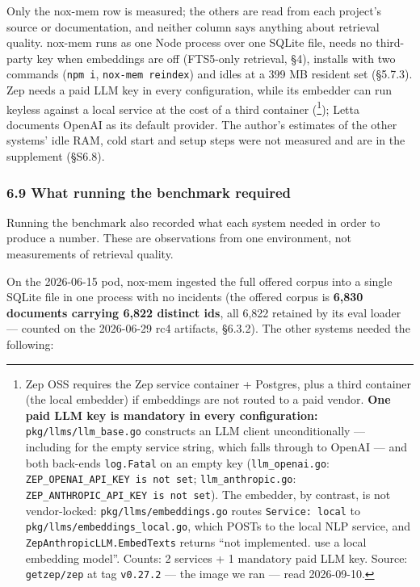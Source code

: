 \documentclass[
]{article}
\begin{document}
Only the nox-mem row is measured; the others are read from each
project's source or documentation, and neither column says anything
about retrieval quality. nox-mem runs as one Node process over one
SQLite file, needs no third-party key when embeddings are off (FTS5-only
retrieval, §4), installs with two commands (\texttt{npm\ i},
\texttt{nox-mem\ reindex}) and idles at a 399 MB resident set (§5.7.3).
Zep needs a paid LLM key in every configuration, while its embedder can
run keyless against a local service at the cost of a third container
(\footnote{Zep OSS requires the Zep service container + Postgres, plus a
  third container (the local embedder) if embeddings are not routed to a
  paid vendor. \textbf{One paid LLM key is mandatory in every
  configuration:} \texttt{pkg/llms/llm\_base.go} constructs an LLM
  client unconditionally --- including for the empty service string,
  which falls through to OpenAI --- and both back-ends
  \texttt{log.Fatal} on an empty key (\texttt{llm\_openai.go}:
  \texttt{ZEP\_OPENAI\_API\_KEY\ is\ not\ set};
  \texttt{llm\_anthropic.go}:
  \texttt{ZEP\_ANTHROPIC\_API\_KEY\ is\ not\ set}). The embedder, by
  contrast, is not vendor-locked: \texttt{pkg/llms/embeddings.go} routes
  \texttt{Service:\ local} to \texttt{pkg/llms/embeddings\_local.go},
  which POSTs to the local NLP service, and
  \texttt{ZepAnthropicLLM.EmbedTexts} returns ``not implemented. use a
  local embedding model''. Counts: 2 services + 1 mandatory paid LLM
  key. Source: \texttt{getzep/zep} at tag \texttt{v0.27.2} --- the image
  we ran --- read 2026-09-10.}); Letta documents OpenAI as its default
provider. The author's estimates of the other systems' idle RAM, cold
start and setup steps were not measured and are in the supplement
(§S6.8).

\subsubsection{6.9 What running the benchmark
required}\label{what-running-the-benchmark-required}

Running the benchmark also recorded what each system needed in order to
produce a number. These are observations from one environment, not
measurements of retrieval quality.

On the 2026-06-15 pod, nox-mem ingested the full offered corpus into a
single SQLite file in one process with no incidents (the offered corpus
is \textbf{6,830 documents carrying 6,822 distinct ids}, all 6,822
retained by its eval loader --- counted on the 2026-06-29 rc4 artifacts,
§6.3.2). The other systems needed the following:
\end{document}
